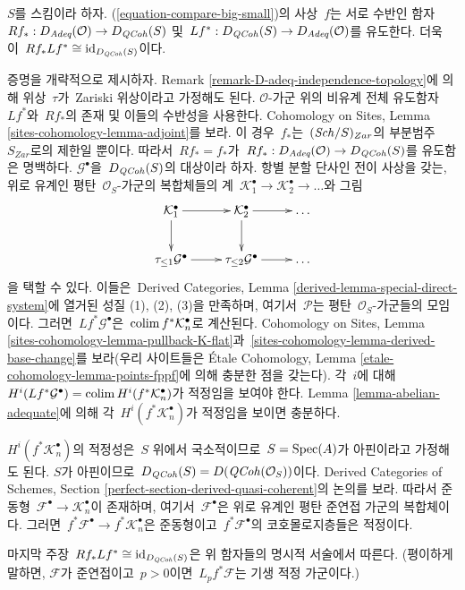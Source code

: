 \begin{remark}
\label{remark-D-adeq-and-D-QCoh}
$S$를 스킴이라 하자. (\ref{equation-compare-big-small})의 사상\  $f$는
서로 수반인 함자\ 
$Rf_* : D_{\textit{Adeq}}(\mathcal{O}) \to D_{\mathit{QCoh}}(S)$
및\ 
$Lf^* : D_{\mathit{QCoh}}(S) \to D_{\textit{Adeq}}(\mathcal{O})$를 유도한다.
더욱이\  $Rf_* Lf^* \cong \text{id}_{D_{\mathit{QCoh}}(S)}$이다.

\medskip\noindent
증명을 개략적으로 제시하자. Remark
\ref{remark-D-adeq-independence-topology}에 의해 위상\  $\tau$가\ 
Zariski 위상이라고 가정해도 된다. $\mathcal{O}$-가군 위의 비유계
전체 유도함자\  $Lf^*$와\  $Rf_*$의 존재 및 이들의 수반성을 사용한다.
Cohomology on Sites, Lemma
\ref{sites-cohomology-lemma-adjoint}를 보라. 이 경우\  $f_*$는\ 
$(\mathit{Sch}/S)_{Zar}$의 부분범주\  $S_{Zar}$로의 제한일 뿐이다. 따라서\ 
$Rf_* = f_*$가\ 
$Rf_* : D_{\textit{Adeq}}(\mathcal{O}) \to D_{\mathit{QCoh}}(S)$를 유도함은
명백하다. $\mathcal{G}^\bullet$을\  $D_{\mathit{QCoh}}(S)$의 대상이라 하자.
항별 분할 단사인 전이 사상을 갖는, 위로 유계인 평탄\ 
$\mathcal{O}_S$-가군의 복합체들의 계\ 
$\mathcal{K}_1^\bullet \to \mathcal{K}_2^\bullet \to \ldots$와 그림
$$
\xymatrix{
\mathcal{K}_1^\bullet \ar[d] \ar[r] &
\mathcal{K}_2^\bullet \ar[d] \ar[r] & \ldots \\
\tau_{\leq 1}\mathcal{G}^\bullet \ar[r] &
\tau_{\leq 2}\mathcal{G}^\bullet \ar[r] & \ldots
}
$$
을 택할 수 있다. 이들은\  Derived Categories, Lemma
\ref{derived-lemma-special-direct-system}에 열거된 성질 (1), (2), (3)을
만족하며, 여기서\  $\mathcal{P}$는 평탄\  $\mathcal{O}_S$-가군들의
모임이다. 그러면\  $Lf^*\mathcal{G}^\bullet$은\ 
$\mathop{\mathrm{colim}}\nolimits f^*\mathcal{K}_n^\bullet$로 계산된다. Cohomology on Sites,
Lemma \ref{sites-cohomology-lemma-pullback-K-flat}과\ 
\ref{sites-cohomology-lemma-derived-base-change}를 보라(우리 사이트들은
\'Etale Cohomology, Lemma
\ref{etale-cohomology-lemma-points-fppf}에 의해 충분한 점을 갖는다).
각\  $i$에 대해\ 
$H^i(Lf^*\mathcal{G}^\bullet) =
\mathop{\mathrm{colim}}\nolimits H^i(f^*\mathcal{K}_n^\bullet)$가 적정임을 보여야 한다.
Lemma \ref{lemma-abelian-adequate}에 의해 각\ 
$H^i(f^*\mathcal{K}_n^\bullet)$가 적정임을 보이면 충분하다.

\medskip\noindent
$H^i(f^*\mathcal{K}_n^\bullet)$의 적정성은\  $S$ 위에서 국소적이므로\ 
$S = \mathop{\mathrm{Spec}}(A)$가 아핀이라고 가정해도 된다. $S$가 아핀이므로\ 
$D_{\mathit{QCoh}}(S) = D(\mathit{QCoh}(\mathcal{O}_S))$이다. Derived Categories of
Schemes, Section \ref{perfect-section-derived-quasi-coherent}의 논의를
보라. 따라서 준동형\ 
$\mathcal{F}^\bullet \to \mathcal{K}_n^\bullet$이 존재하며, 여기서\ 
$\mathcal{F}^\bullet$은 위로 유계인 평탄 준연접 가군의 복합체이다.
그러면\  $f^*\mathcal{F}^\bullet \to f^*\mathcal{K}_n^\bullet$은
준동형이고\  $f^*\mathcal{F}^\bullet$의 코호몰로지층들은 적정이다.

\medskip\noindent
마지막 주장\  $Rf_* Lf^* \cong \text{id}_{D_{\mathit{QCoh}}(S)}$은 위 함자들의
명시적 서술에서 따른다. (평이하게 말하면, $\mathcal{F}$가
준연접이고\  $p > 0$이면\  $L_pf^*\mathcal{F}$는 기생 적정 가군이다.)
\end{remark}


